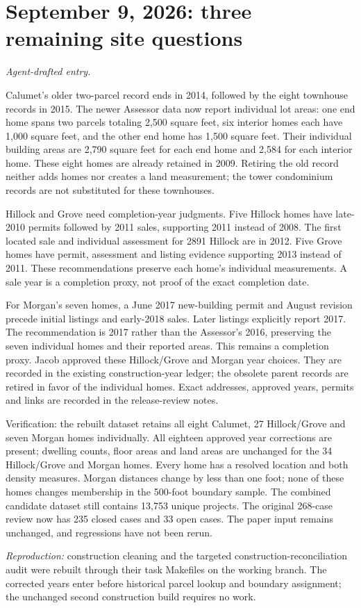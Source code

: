 \clearpage
\section*{September 9, 2026: three remaining site questions}
\textit{Agent-drafted entry.}

Calumet's older two-parcel record ends in 2014, followed by the eight townhouse records in 2015. The newer Assessor data now report individual lot areas: one end home spans two parcels totaling 2,500 square feet, six interior homes each have 1,000 square feet, and the other end home has 1,500 square feet. Their individual building areas are 2,790 square feet for each end home and 2,584 for each interior home. These eight homes are already retained in 2009. Retiring the old record neither adds homes nor creates a land measurement; the tower condominium records are not substituted for these townhouses.

Hillock and Grove need completion-year judgments. Five Hillock homes have late-2010 permits followed by 2011 sales, supporting 2011 instead of 2008. The first located sale and individual assessment for 2891 Hillock are in 2012. Five Grove homes have permit, assessment and listing evidence supporting 2013 instead of 2011. These recommendations preserve each home's individual measurements. A sale year is a completion proxy, not proof of the exact completion date.

For Morgan's seven homes, a June 2017 new-building permit and August revision precede initial listings and early-2018 sales. Later listings explicitly report 2017. The recommendation is 2017 rather than the Assessor's 2016, preserving the seven individual homes and their reported areas. This remains a completion proxy. Jacob approved these Hillock/Grove and Morgan year choices. They are recorded in the existing construction-year ledger; the obsolete parent records are retired in favor of the individual homes. Exact addresses, approved years, permits and links are recorded in the release-review notes.

Verification: the rebuilt dataset retains all eight Calumet, 27 Hillock/Grove and seven Morgan homes individually. All eighteen approved year corrections are present; dwelling counts, floor areas and land areas are unchanged for the 34 Hillock/Grove and Morgan homes. Every home has a resolved location and both density measures. Morgan distances change by less than one foot; none of these homes changes membership in the 500-foot boundary sample. The combined candidate dataset still contains 13,753 unique projects. The original 268-case review now has 235 closed cases and 33 open cases. The paper input remains unchanged, and regressions have not been rerun.

\textit{Reproduction:} construction cleaning and the targeted construction-reconciliation audit were rebuilt through their task Makefiles on the working branch. The corrected years enter before historical parcel lookup and boundary assignment; the unchanged second construction build requires no work.
